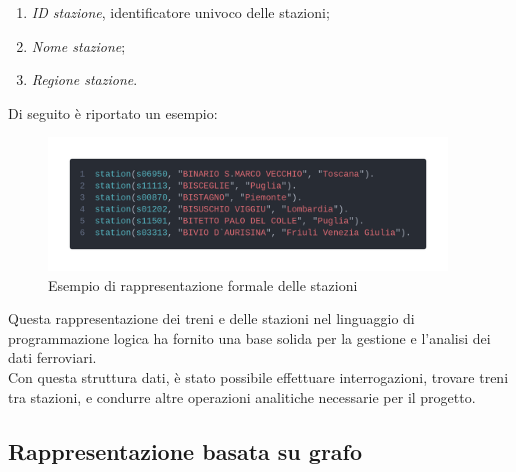 \documentclass[italian,12pt,a4paper]{article}
\begin{document}
		\begin{enumerate}
			\item \textit{ID stazione}, identificatore univoco delle stazioni;
			\item \textit{Nome stazione};
			\item \textit{Regione stazione}.
		\end{enumerate}
		Di seguito è riportato un esempio:
	
		\begin{figure}[!h]
			\centering
			\includegraphics[width=400px]{img/code_prolog2}
			\caption{Esempio di rappresentazione formale delle stazioni}
		\end{figure}
		\vspace{10px}
		\setlength{\parindent}{0cm}
		Questa rappresentazione dei treni e delle stazioni nel linguaggio di programmazione logica ha fornito una base solida per la gestione e l'analisi dei dati ferroviari. \\
		\linebreak
		Con questa struttura dati, è stato possibile effettuare interrogazioni, trovare treni tra stazioni, e condurre altre operazioni analitiche necessarie per il progetto.

\subsection{Rappresentazione basata su grafo}
\end{document}
